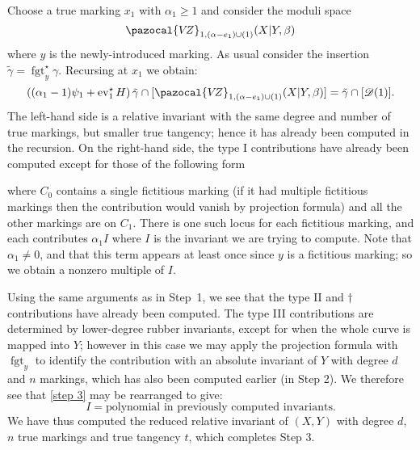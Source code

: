 \documentclass[11pt]{amsart}
\newcommand{\sqC}{\scalebox{0.8}[1.3]{$\sqsubset$}}
\newcommand{\VZ}{\pazocal{V\!Z}}
\newcommand{\st}{\star}
\newcommand{\ev}{\operatorname{ev}}
\newcommand{\fgt}{\operatorname{fgt}}
\newcommand{\Dcal}{\mathcal{D}}
\theoremstyle{definition}
\theoremstyle{definition}
\begin{document}
Choose a true marking $x_1$ with $\alpha_1 \geq 1$ and consider the moduli space
\begin{equation*} \VZ_{1,(\alpha-e_1)\cup(1)}(X|Y,\beta) \end{equation*}
where $y$ is the newly-introduced marking. As usual consider the insertion $\tilde\gamma=\fgt_y^\star \gamma$. Recursing at $x_1$ we obtain:
\begin{equation}\label{step 3} \left( (\alpha_1-1)\psi_1 + \ev_1^\st H\right) \tilde\gamma \cap [\VZ_{1,(\alpha-e_1)\cup(1)}(X|Y,\beta)] = \tilde\gamma \cap [\Dcal(1)].\end{equation}
The left-hand side is a relative invariant with the same degree and number of true markings, but smaller true tangency; hence it has already been computed in the recursion. On the right-hand side, the type I contributions have already been computed except for those of the following form
\begin{center}
\end{center}
where $C_0$ contains a single fictitious marking (if it had multiple fictitious markings then the contribution would vanish by projection formula) and all the other markings are on $C_1$. There is one such locus for each fictitious marking, and each contributes $\alpha_1 I$ where $I$ is the invariant we are trying to compute. Note that $\alpha_1 \neq 0$, and that this term appears at least once since $y$ is a fictitious marking; so we obtain a nonzero multiple of $I$.

Using the same arguments as in Step~1, we see that the type II and $\dag$ contributions have already been computed. The type III contributions are determined by lower-degree rubber invariants, except for when the whole curve is mapped into $Y$; however in this case we may apply the projection formula with $\fgt_y$ to identify the contribution with an absolute invariant of $Y$ with degree $d$ and $n$ markings, which has also been computed earlier (in Step 2). We therefore see that \eqref{step 3} may be rearranged to give:
\begin{equation*} I = \text{polynomial in previously computed invariants}.\end{equation*}
We have thus computed the reduced relative invariant of $(X,Y)$ with degree $d$, $n$ true markings and true tangency $t$, which completes Step 3.
\end{document}
